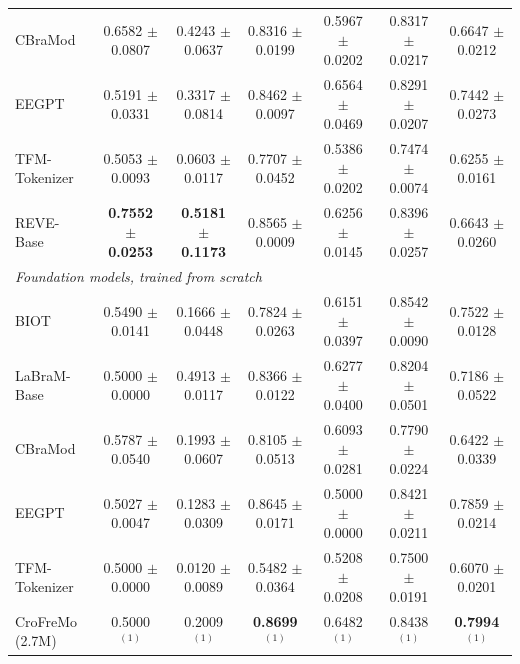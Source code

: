 \begin{table}[t]
{\begin{tabular}{lcccccc}
CBraMod & 0.6582 $\pm$ 0.0807 & 0.4243 $\pm$ 0.0637 & 0.8316 $\pm$ 0.0199 & 0.5967 $\pm$ 0.0202 & 0.8317 $\pm$ 0.0217 & 0.6647 $\pm$ 0.0212 \\
EEGPT & 0.5191 $\pm$ 0.0331 & 0.3317 $\pm$ 0.0814 & 0.8462 $\pm$ 0.0097 & 0.6564 $\pm$ 0.0469 & 0.8291 $\pm$ 0.0207 & 0.7442 $\pm$ 0.0273 \\
TFM-Tokenizer & 0.5053 $\pm$ 0.0093 & 0.0603 $\pm$ 0.0117 & 0.7707 $\pm$ 0.0452 & 0.5386 $\pm$ 0.0202 & 0.7474 $\pm$ 0.0074 & 0.6255 $\pm$ 0.0161 \\
REVE-Base & \textbf{0.7552 $\pm$ 0.0253} & \textbf{0.5181 $\pm$ 0.1173} & 0.8565 $\pm$ 0.0009 & 0.6256 $\pm$ 0.0145 & 0.8396 $\pm$ 0.0257 & 0.6643 $\pm$ 0.0260 \\
\midrule
\multicolumn{7}{l}{\textit{Foundation models, trained from scratch}} \\
BIOT & 0.5490 $\pm$ 0.0141 & 0.1666 $\pm$ 0.0448 & 0.7824 $\pm$ 0.0263 & 0.6151 $\pm$ 0.0397 & 0.8542 $\pm$ 0.0090 & 0.7522 $\pm$ 0.0128 \\
LaBraM-Base & 0.5000 $\pm$ 0.0000 & 0.4913 $\pm$ 0.0117 & 0.8366 $\pm$ 0.0122 & 0.6277 $\pm$ 0.0400 & 0.8204 $\pm$ 0.0501 & 0.7186 $\pm$ 0.0522 \\
CBraMod & 0.5787 $\pm$ 0.0540 & 0.1993 $\pm$ 0.0607 & 0.8105 $\pm$ 0.0513 & 0.6093 $\pm$ 0.0281 & 0.7790 $\pm$ 0.0224 & 0.6422 $\pm$ 0.0339 \\
EEGPT & 0.5027 $\pm$ 0.0047 & 0.1283 $\pm$ 0.0309 & 0.8645 $\pm$ 0.0171 & 0.5000 $\pm$ 0.0000 & 0.8421 $\pm$ 0.0211 & 0.7859 $\pm$ 0.0214 \\
TFM-Tokenizer & 0.5000 $\pm$ 0.0000 & 0.0120 $\pm$ 0.0089 & 0.5482 $\pm$ 0.0364 & 0.5208 $\pm$ 0.0208 & 0.7500 $\pm$ 0.0191 & 0.6070 $\pm$ 0.0201 \\
\midrule
CroFreMo (2.7M) & 0.5000$^{(1)}$ & 0.2009$^{(1)}$ & \textbf{0.8699$^{(1)}$} & 0.6482$^{(1)}$ & 0.8438$^{(1)}$ & \textbf{0.7994$^{(1)}$} \\
\bottomrule
\end{tabular}}
\end{table}

